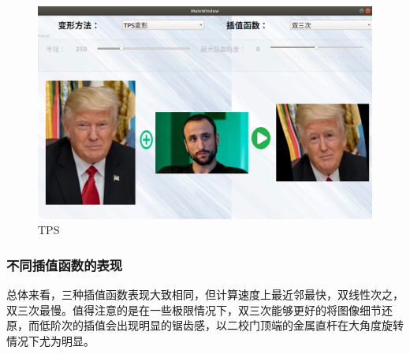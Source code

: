 \documentclass[UTF8]{ctexart}
\begin{document}
\begin{figure}[H]
    \centering
    \includegraphics[scale=0.3]{images/report-images/trump.png}
    \caption{TPS}
\end{figure}

\subsubsection{不同插值函数的表现}
总体来看，三种插值函数表现大致相同，但计算速度上最近邻最快，双线性次之，双三次最慢。值得注意的是在一些极限情况下，双三次能够更好的将图像细节还原，而低阶次的插值会出现明显的锯齿感，以二校门顶端的金属直杆在大角度旋转情况下尤为明显。
\end{document}
